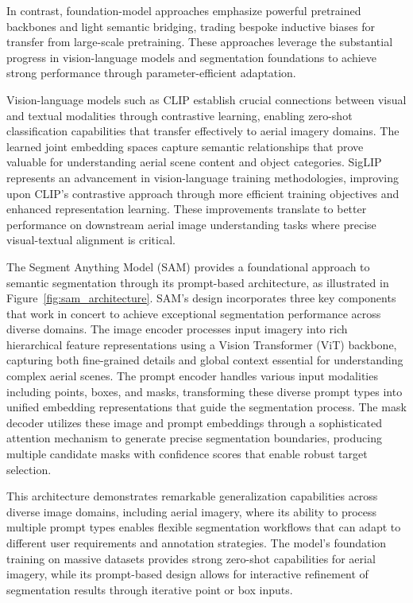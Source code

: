 In contrast, foundation-model approaches emphasize powerful pretrained backbones and light semantic bridging, trading bespoke inductive biases for transfer from large-scale pretraining. These approaches leverage the substantial progress in vision-language models and segmentation foundations to achieve strong performance through parameter-efficient adaptation.

Vision-language models such as CLIP establish crucial connections between visual and textual modalities through contrastive learning, enabling zero-shot classification capabilities that transfer effectively to aerial imagery domains. The learned joint embedding spaces capture semantic relationships that prove valuable for understanding aerial scene content and object categories. SigLIP represents an advancement in vision-language training methodologies, improving upon CLIP's contrastive approach through more efficient training objectives and enhanced representation learning. These improvements translate to better performance on downstream aerial image understanding tasks where precise visual-textual alignment is critical.

The Segment Anything Model (SAM) provides a foundational approach to semantic segmentation through its prompt-based architecture, as illustrated in Figure~\ref{fig:sam_architecture}. SAM's design incorporates three key components that work in concert to achieve exceptional segmentation performance across diverse domains. The image encoder processes input imagery into rich hierarchical feature representations using a Vision Transformer (ViT) backbone, capturing both fine-grained details and global context essential for understanding complex aerial scenes. The prompt encoder handles various input modalities including points, boxes, and masks, transforming these diverse prompt types into unified embedding representations that guide the segmentation process. The mask decoder utilizes these image and prompt embeddings through a sophisticated attention mechanism to generate precise segmentation boundaries, producing multiple candidate masks with confidence scores that enable robust target selection.

This architecture demonstrates remarkable generalization capabilities across diverse image domains, including aerial imagery, where its ability to process multiple prompt types enables flexible segmentation workflows that can adapt to different user requirements and annotation strategies. The model's foundation training on massive datasets provides strong zero-shot capabilities for aerial imagery, while its prompt-based design allows for interactive refinement of segmentation results through iterative point or box inputs.

